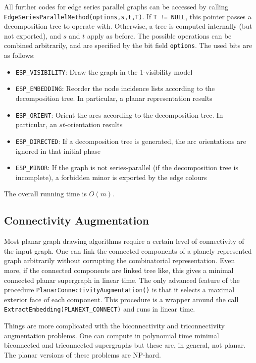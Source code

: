 \documentclass[a4paper,11pt,twoside]{book}
\begin{document}
\begin{multicols}{2}
All further codes for edge series parallel graphs can be accessed by
calling \verb/EdgeSeriesParallelMethod(options,s,t,T)/. If \verb/T != NULL/,
this pointer passes a decomposition tree to operate with. Otherwise, a tree
is computed internally (but not exported), and $s$ and $t$ apply as before.
The possible operations can be combined arbitrarily, and are specified by
the bit field \verb/options/. The used bits are as follows:
\begin{itemize}
\item \verb/ESP_VISIBILITY/: Draw the graph in the 1-visibility model
\item \verb/ESP_EMBEDDING/: Reorder the node incidence lists according to the
    decomposition tree. In particular, a planar representation results
\item \verb/ESP_ORIENT/: Orient the arcs according to the decomposition tree.
    In particular, an $st$-orientation results
\item \verb/ESP_DIRECTED/: If a decomposition tree is generated, the arc
    orientations are ignored in that initial phase
\item \verb/ESP_MINOR/: If the graph is not series-parallel (if the decomposition
    tree is incomplete), a forbidden minor is exported by the edge colours
\end{itemize}
The overall running time is $O(m)$.

\subsection{Connectivity Augmentation}
Most planar graph drawing algorithms require a certain level of connectivity of
the input graph. One can link the connected components of a planely represented
graph arbitrarily without corrupting the combinatorial representation. Even more,
if the connected components are linked tree like, this gives a minimal
connected planar supergraph in linear time. The only advanced feature of the
procedure \verb/PlanarConnectivityAugmentation()/ is that it selects a maximal
exterior face of each component. This procedure is a wrapper around the call
\verb/ExtractEmbedding(PLANEXT_CONNECT)/ and runs in linear time.

Things are more complicated with the biconnectivity and triconnectivity
augmentation problems. One can compute in polynomial time minimal biconnected
and triconnected supergraphs but these are, in general, not planar. The planar
versions of these problems are NP-hard.


\end{multicols}
\end{document}
